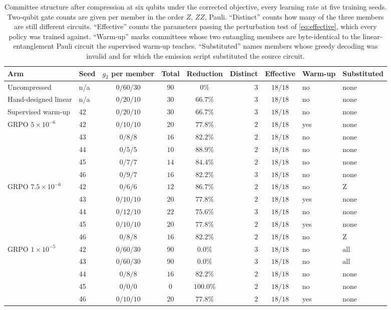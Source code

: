 \begin{table}[t]
\centering
\caption{Committee structure after compression at six qubits under the corrected
objective, every learning rate at five training seeds. Two-qubit gate counts are given
per member in the order $Z$, $ZZ$, Pauli. ``Distinct'' counts how many of the three
members are still different circuits. ``Effective'' counts the parameters passing the
perturbation test of \eqref{eq:effective}, which every policy was trained against.
``Warm-up'' marks committees whose two entangling members are byte-identical to the
linear-entanglement Pauli circuit the supervised warm-up teaches. ``Substituted'' names
members whose greedy decoding was invalid and for which the emission script substituted
the source circuit.}
\label{tab:compstructure}
\footnotesize
\setlength{\tabcolsep}{2pt}
\begin{tabular}{@{}llcccrcll@{}}
\toprule
Arm & Seed & $g_2$ per member & Total & Reduction & Distinct & Effective & Warm-up & Substituted \\
\midrule
Uncompressed & n/a & $0/60/30$ & $90$ & $0\%$ & $3$ & $18/18$ & no & none \\
Hand-designed linear & n/a & $0/20/10$ & $30$ & $66.7\%$ & $3$ & $18/18$ & no & none \\
Supervised warm-up & 42 & $0/20/10$ & $30$ & $66.7\%$ & $3$ & $18/18$ & no & none \\
\midrule
\multirow{5}{*}{GRPO $5\times10^{-6}$}
 & 42 & $0/10/10$ & $20$ & $77.8\%$ & $2$ & $18/18$ & yes & none \\
 & 43 & $0/8/8$ & $16$ & $82.2\%$ & $2$ & $18/18$ & no & none \\
 & 44 & $0/5/5$ & $10$ & $88.9\%$ & $2$ & $18/18$ & no & none \\
 & 45 & $0/7/7$ & $14$ & $84.4\%$ & $2$ & $18/18$ & no & none \\
 & 46 & $0/9/7$ & $16$ & $82.2\%$ & $3$ & $18/18$ & no & none \\
\midrule
\multirow{5}{*}{GRPO $7.5\times10^{-6}$}
 & 42 & $0/6/6$ & $12$ & $86.7\%$ & $2$ & $18/18$ & no & Z \\
 & 43 & $0/10/10$ & $20$ & $77.8\%$ & $2$ & $18/18$ & yes & none \\
 & 44 & $0/12/10$ & $22$ & $75.6\%$ & $3$ & $18/18$ & no & none \\
 & 45 & $0/10/10$ & $20$ & $77.8\%$ & $2$ & $18/18$ & yes & none \\
 & 46 & $0/8/8$ & $16$ & $82.2\%$ & $2$ & $18/18$ & no & Z \\
\midrule
\multirow{5}{*}{GRPO $1\times10^{-5}$}
 & 42 & $0/60/30$ & $90$ & $0.0\%$ & $3$ & $18/18$ & no & all \\
 & 43 & $0/60/30$ & $90$ & $0.0\%$ & $3$ & $18/18$ & no & all \\
 & 44 & $0/8/8$ & $16$ & $82.2\%$ & $2$ & $18/18$ & no & none \\
 & 45 & $0/0/0$ & $0$ & $100.0\%$ & $2$ & $18/18$ & no & none \\
 & 46 & $0/10/10$ & $20$ & $77.8\%$ & $2$ & $18/18$ & yes & none \\
\bottomrule
\end{tabular}
\end{table}
